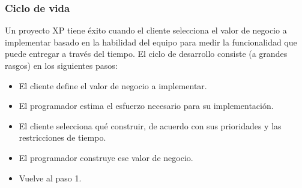 


\subsubsection{Ciclo de vida}


\setlength{\parskip}{5mm}
Un proyecto XP tiene éxito cuando el cliente selecciona el valor de negocio a implementar basado en la habilidad del equipo para medir la funcionalidad que puede entregar a través del tiempo. El ciclo de desarrollo consiste (a grandes rasgos) en los siguientes pasos:

\begin{itemize}

	\item El cliente define el valor de negocio a implementar.

	\item El programador estima el esfuerzo necesario para su implementación.

	\item El cliente selecciona qué construir, de acuerdo con sus prioridades y las restricciones de tiempo.

	\item El programador construye ese valor de negocio.

	\item Vuelve al paso 1.

\end{itemize}
    
